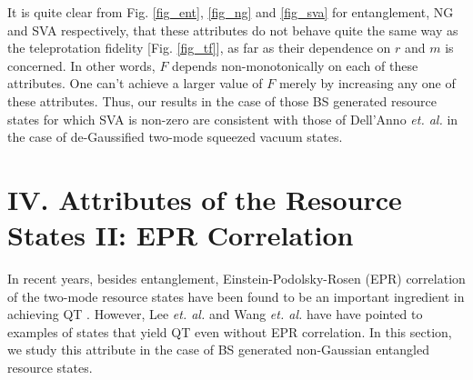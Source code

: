 \documentclass[letter,scriptaddress,twocolumn, prl,showkeys]{revtex4}
\begin{document}
It is quite clear from Fig. \ref{fig_ent}, \ref{fig_ng} and \ref{fig_sva} for entanglement, NG and SVA respectively, that these attributes do not behave quite the same way as the teleprotation fidelity [Fig. \ref{fig_tf}], as far as their dependence on $r$ and $m$ is concerned.
In other words, $F$ depends non-monotonically on each of these attributes. 
One can't achieve a larger value of $F$ merely by increasing any one of these attributes.
Thus, our results in the case of those BS generated resource states for which SVA is non-zero are consistent with those of Dell'Anno \emph{et. al.} in the case of de-Gaussified two-mode squeezed vacuum states.

\section*{IV. Attributes of the Resource States II: EPR Correlation}

In recent years, besides entanglement, Einstein-Podolsky-Rosen (EPR) correlation \cite{epr_corr} of the two-mode resource states have been found to be an important ingredient in achieving QT \cite{tp_yang,tp_agarwal,tp_zubairy}.
However, Lee \emph{et. al.} \cite{tp_lee} and Wang \emph{et. al.} \cite{tp_wang} have have pointed to examples of states that yield QT even without EPR correlation.
In this section, we study this attribute in the case of BS generated non-Gaussian entangled resource states.
\end{document}
